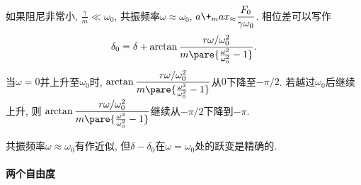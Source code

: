 \documentclass{ctexart}
\begin{document}
如果阻尼非常小, $\displaystyle \frac{\gamma}{m} \ll \omega_0$, 共振频率$\omega \approx \omega_0$, $\displaystyle a\+_max_ \approx \frac{F_0}{\gamma \omega_0}$.
相位差可以写作
\[ \delta_0 = \delta + \arctan \frac{r\omega/\omega_0^2}{m\pare{\frac{\omega^2}{\omega_0^2} -1}}. \]
当$\omega = 0$并上升至$\omega_0$时, $\displaystyle \arctan \frac{r\omega/\omega_0^2}{m\pare{\frac{\omega^2}{\omega_0^2} -1}}$从$0$下降至$-\pi/2$. 若越过$\omega_0$后继续上升, 则
$\displaystyle \arctan \frac{r\omega/\omega_0^2}{m\pare{\frac{\omega^2}{\omega_0^2} -1}}$继续从$-\pi/2$下降到$-\pi$.
\begin{pitfall}
    共振频率$\omega \approx \omega_0$有作近似, 但$\delta - \delta_0$在$\omega = \omega_0$处的跃变是精确的.
\end{pitfall}


\paragraph{两个自由度} %
\label{par:两个自由度}
\end{document}
